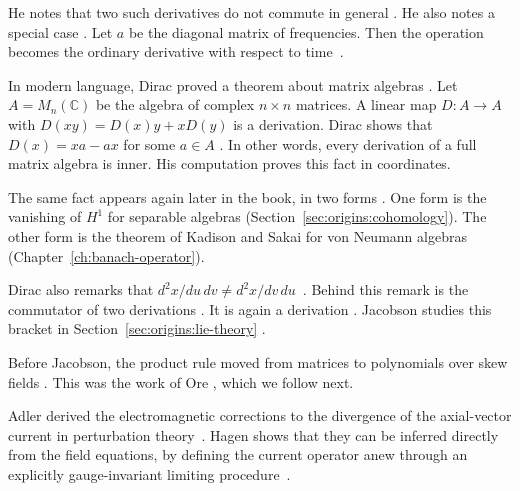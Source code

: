 He notes that two such derivatives do not commute in general \cite[\S 3,
p.~647]{Dirac1925}. He also notes a special case \cite[\S 3,
p.~647]{Dirac1925}. Let $a$ be the diagonal matrix of frequencies. Then the
operation becomes the ordinary derivative with respect to time~\cite[\S 3,
p.~647]{Dirac1925}.

In modern language, Dirac proved a theorem about matrix algebras \cite[\S 3,
p.~647]{Dirac1925}. Let $A = M_n(\mathbb{C})$ be the algebra of complex $n
\times n$ matrices. A linear map $D\colon A \to A$ with $D(xy) = D(x)y +
xD(y)$ is a derivation. Dirac shows that $D(x) = xa - ax$ for some $a \in A$
\cite[\S 3, p.~647]{Dirac1925}. In other words, every derivation of a full
matrix algebra is inner. His computation proves this fact in coordinates.

The same fact appears again later in the book, in two forms \cite[\S 2, p.~862]{BornJordan1925}. One form is the
vanishing of $H^1$ for separable algebras
(Section~\ref{sec:origins:cohomology}). The other form is the theorem of
Kadison and Sakai for von Neumann algebras (Chapter~\ref{ch:banach-operator}).

Dirac also remarks that $d^2x/du\,dv \neq d^2x/dv\,du$~\cite[p.~206]{Jacobson1937}. Behind this remark is
the commutator of two derivations \cite[p.~206]{Jacobson1937}. It is again a
derivation \cite[\S 3, p.~647]{Dirac1925}. Jacobson
studies this bracket in Section~\ref{sec:origins:lie-theory}
\cite[p.~206]{Jacobson1937}.

Before Jacobson, the product rule moved from matrices to polynomials over
skew fields \cite[p.~206]{Jacobson1937}. This was the work of Ore
\cite[p.~480]{Ore1933}, which we follow next.

Adler derived the electromagnetic corrections to the divergence of the
axial-vector current in perturbation theory~\cite{WlDerivationOfAdlersDivergenceCo1969}. Hagen shows that they can be
inferred
directly from the field equations, by defining the current operator anew through
an explicitly gauge-invariant limiting
procedure~\cite{WlDerivationOfAdlersDivergenceCo1969}.
